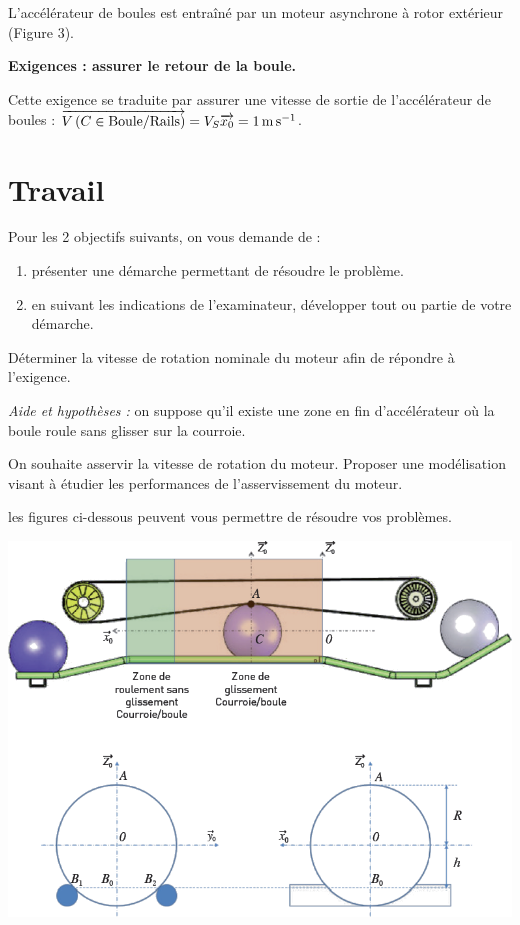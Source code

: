 \documentclass[10pt,fleqn]{article} %
\begin{document}
\begin{multicols}{2}
L’accélérateur de boules est entraîné par un moteur asynchrone à rotor extérieur (Figure 3).

\begin{obj}
\textbf{Exigences : assurer le retour de la boule.}

Cette exigence se traduite par assurer une vitesse de sortie de l'accélérateur de boules : 
$\overrightarrow{V\left( {C} \in {\text{Boule}}/{\text{Rails}}\right)}=V_S\overrightarrow{x_0} = \SI{1}{m.s^{-1}}$.

\end{obj}

\section*{Travail}

Pour les 2 objectifs suivants, on vous demande de :
\begin{enumerate}
\item présenter une démarche permettant de résoudre le problème.
\item en suivant les indications de l’examinateur, développer tout ou partie de votre
démarche.
\end{enumerate}

\begin{obj}[Objectif 1]
Déterminer la vitesse de rotation nominale du moteur afin de répondre à l’exigence.

\textit{Aide et hypothèses : }on suppose qu’il existe une zone en fin d’accélérateur où la boule roule sans glisser sur la courroie.
\end{obj}

\begin{obj}[Objectif 2]
On souhaite asservir la vitesse de rotation du moteur. Proposer une modélisation visant à
étudier les performances de l’asservissement du moteur.

 les figures ci-dessous peuvent vous permettre de résoudre vos problèmes.
\end{obj}

\begin{center}
\includegraphics[width=\linewidth]{images/fig_04}
\end{center}

\ifprof
\else
\end{multicols}
\end{document}
